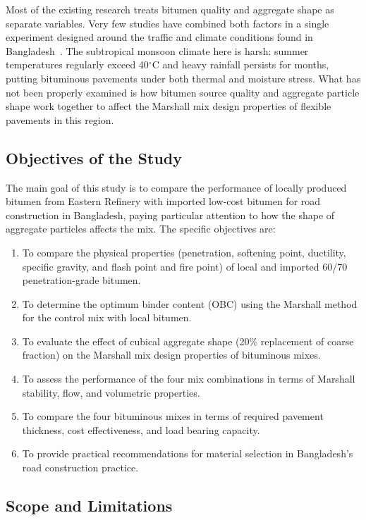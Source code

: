 \documentclass[12pt,a4paper]{article}
\begin{document}
Most of the existing research treats bitumen quality and aggregate shape as separate variables. Very few studies have combined both factors in a single experiment designed around the traffic and climate conditions found in Bangladesh~\cite{sood2015evaluation}. The subtropical monsoon climate here is harsh: summer temperatures regularly exceed 40$^{\circ}$C and heavy rainfall persists for months, putting bituminous pavements under both thermal and moisture stress. What has not been properly examined is how bitumen source quality and aggregate particle shape work together to affect the Marshall mix design properties of flexible pavements in this region.

\subsection{Objectives of the Study}

The main goal of this study is to compare the performance of locally produced bitumen from Eastern Refinery with imported low-cost bitumen for road construction in Bangladesh, paying particular attention to how the shape of aggregate particles affects the mix. The specific objectives are:

\begin{enumerate}[label=\roman*.]
    \item To compare the physical properties (penetration, softening point, ductility, specific gravity, and flash point and fire point) of local and imported 60/70 penetration-grade bitumen.
    \item To determine the optimum binder content (OBC) using the Marshall method for the control mix with local bitumen.
    \item To evaluate the effect of cubical aggregate shape (20\% replacement of coarse fraction) on the Marshall mix design properties of bituminous mixes.
    \item To assess the performance of the four mix combinations in terms of Marshall stability, flow, and volumetric properties.
    \item To compare the four bituminous mixes in terms of required pavement thickness, cost effectiveness, and load bearing capacity.
    \item To provide practical recommendations for material selection in Bangladesh's road construction practice.
\end{enumerate}

\subsection{Scope and Limitations}
\end{document}
